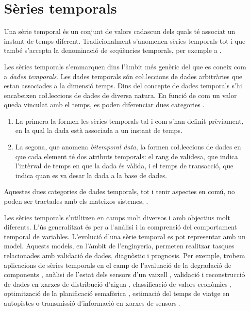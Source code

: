 \section{Sèries temporals}

Una sèrie temporal és un conjunt de valors cadascun dels quals té
associat un instant de temps diferent.  Tradicionalment s'anomenen
sèries temporals tot i que també s'accepta la denominació de
seqüències temporals, per exemple a \cite{last:hetland}.

Les sèries temporals s'emmarquen dins l'àmbit més genèric del que es
coneix com a \emph{dades temporals}. Les dades temporals són
co\l.leccions de dades arbitràries que estan associades a la dimensió
temps.  Dins del concepte de dades temporals s'hi encabeixen
co\l.leccions de dades de diversa natura. En funció de com un valor
queda vinculat amb el temps, es poden diferenciar dues
categories \parencite{assfalg08:thesis}.
\begin{enumerate}
\item La primera la formen les sèries temporals tal i com s'han
  definit prèviament, en la qual la dada està associada a un instant
  de temps.
\item La segona, que anomena \emph{bitemporal data}, la formen
  co\l.leccions de dades en que cada element té dos atributs
  temporals: el rang de validesa, que indica l'intèrval de temps en
  que la dada és vàlida, i el temps de transacció, que indica quan es
  va desar la dada a la base de dades.  
\end{enumerate}
Aquestes dues categories de dades temporals, tot i tenir aspectes en
comú, no poden ser tractades amb els mateixos
sistemes, \parencite{schmidt95}.


Les sèries temporals s'utilitzen en camps molt diversos i amb
objectius molt diferents. L'ús generalitzat és per a l'anàlisi i la
comprensió del comportament temporal de variables. L'evolució d'una
sèrie temporal es pot representar amb un model. Aquests models, en
l'àmbit de l'enginyeria, permeten realitzar tasques relacionades amb
validació de dades, diagnòstic i prognosis.  Per exemple, trobem
aplicacions de sèries temporals en el camp de l'avaluació de la
degradació de components \parencite{yu11}, anàlisi de l'estat dels
sensors d'un vaixell \parencite{palmer07}, validació i reconstrucció
de dades en xarxes de distribució d'aigua \parencite{quevedo10},
classificació de valors econòmics \parencite{dreyer95}, optimització
de la planificació semafòrica \parencite{last11}, estimació del temps
de viatge en autopistes \parencite{soriguera10} o transmissió
d'informació en xarxes de
sensors \parencite{jainagrawal05,yaogehrke02}.



